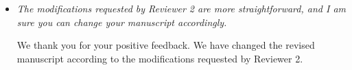 \documentclass[a4paper]{article}
\begin{document}
\begin{itemize}
\item \textit{The modifications requested by Reviewer 2 are more straightforward, and I am sure you can change your manuscript accordingly.}
\vspace{.2cm}

We thank you for your positive feedback. We have changed the revised manuscript according to the modifications requested by Reviewer 2.

\end{itemize}

%
%
\end{document}
